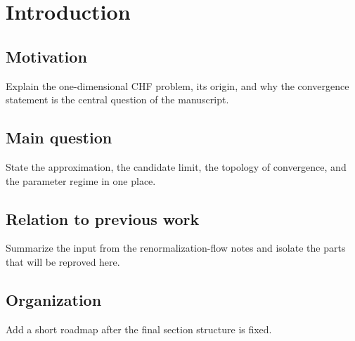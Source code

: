 \section{Introduction}

\subsection{Motivation}

\begin{draftnote}
Explain the one-dimensional CHF problem, its origin, and why the convergence
statement is the central question of the manuscript.
\end{draftnote}

\subsection{Main question}

\begin{draftnote}
State the approximation, the candidate limit, the topology of convergence,
and the parameter regime in one place.
\end{draftnote}

\subsection{Relation to previous work}

\begin{draftnote}
Summarize the input from the renormalization-flow notes and isolate the parts
that will be reproved here.
\end{draftnote}

\subsection{Organization}

\begin{draftnote}
Add a short roadmap after the final section structure is fixed.
\end{draftnote}
